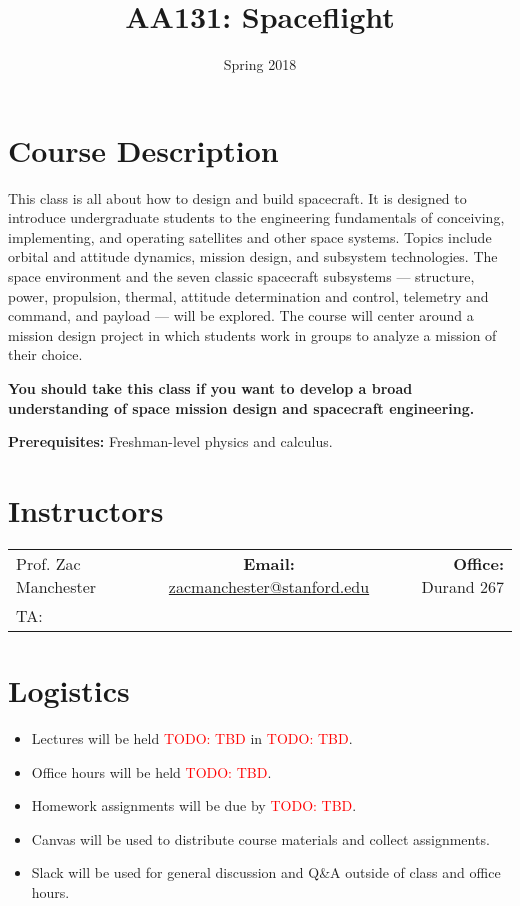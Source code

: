 \documentclass[11pt,letterpaper]{article}
\title{AA131: Spaceflight}
\author{Spring 2018}
\date{}
\newcommand{\todo}[1]{\textcolor{red}{TODO: #1}}
\begin{document}
\maketitle

\section*{Course Description}

This class is all about how to design and build spacecraft. It is designed to introduce undergraduate students to the engineering fundamentals of conceiving, implementing, and operating satellites and other space systems. Topics include orbital and attitude dynamics, mission design, and subsystem technologies. The space environment and the seven classic spacecraft subsystems --- structure, power, propulsion, thermal, attitude determination and control, telemetry and command, and payload --- will be explored. The course will center around a mission design project in which students work in groups to analyze a mission of their choice.

\medskip
\noindent
\textbf{You should take this class if you want to develop a broad understanding of space mission design and spacecraft engineering.}

\medskip
\noindent
\textbf{Prerequisites:} Freshman-level physics and calculus.

\section*{Instructors}

\begin{center}
\begin{tabular}{l c r}
	Prof. Zac Manchester & \textbf{Email:} \href{mailto:zacmanchester@stanford.edu}{zacmanchester@stanford.edu} & \textbf{Office:} Durand 267 \\
	TA: 
\end{tabular}
\end{center}

\section*{Logistics}

\begin{itemize}
	\item Lectures will be held \todo{TBD} in \todo{TBD}.
	\item Office hours will be held \todo{TBD}.
	\item Homework assignments will be due by \todo{TBD}.
	\item Canvas will be used to distribute course materials and collect assignments.
	\item Slack will be used for general discussion and Q\&A outside of class and office hours.
\end{itemize}
\end{document}
